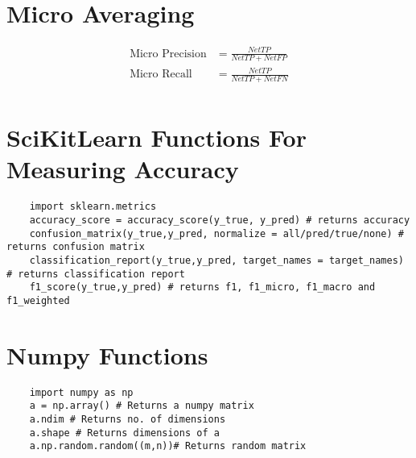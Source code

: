 \documentclass{report}
\begin{document}
\section{Micro Averaging}
\begin{align*}
	\text{Micro Precision} &= \frac{Net TP}{Net TP + Net FP} \\
	\text{Micro Recall} &= \frac{Net TP}{Net TP + Net FN} \\
\end{align*}
\section{SciKitLearn Functions For Measuring Accuracy}
\begin{lstlisting}
	import sklearn.metrics
	accuracy_score = accuracy_score(y_true, y_pred) # returns accuracy
	confusion_matrix(y_true,y_pred, normalize = all/pred/true/none) # returns confusion matrix
	classification_report(y_true,y_pred, target_names = target_names) # returns classification report
	f1_score(y_true,y_pred) # returns f1, f1_micro, f1_macro and f1_weighted
\end{lstlisting}

\section{Numpy Functions}
\begin{lstlisting}
	import numpy as np
	a = np.array() # Returns a numpy matrix 
	a.ndim # Returns no. of dimensions
	a.shape # Returns dimensions of a
	a.np.random.random((m,n))# Returns random matrix
\end{lstlisting}
\end{document}
